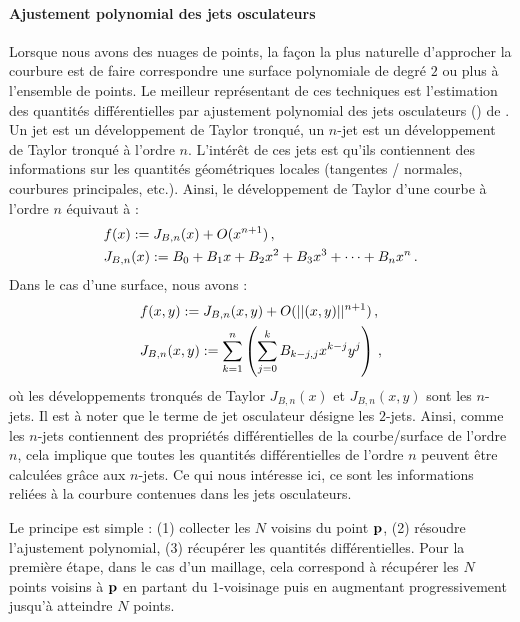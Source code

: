 \paragraph{Ajustement polynomial des jets osculateurs}
%
Lorsque nous avons des nuages de points, la façon la plus naturelle d'approcher
la courbure est de faire correspondre une surface polynomiale de degré $2$ ou
plus à l'ensemble de points. Le meilleur représentant de ces techniques est
l'estimation des quantités différentielles par ajustement polynomial des jets
osculateurs () de . Un jet
est un développement de Taylor tronqué, un $n$-jet est un développement de
Taylor tronqué à l'ordre $n$. L'intérêt de ces jets est qu'ils contiennent des
informations sur les quantités géométriques locales (tangentes / normales,
courbures principales, etc.).
%
%
Ainsi, le développement de Taylor d'une courbe à l'ordre $n$ équivaut à :
%
\begin{align}
  &f(x) := J_{B,n}(x) + O(x^{n+1}) \,, \\
  &J_{B,n}(x) := B_0 + B_1x + B_2x^2 + B_3x^3 + \cdots + B_nx^n \,.
\end{align}
%
Dans le cas d'une surface, nous avons :
%
\begin{align}
  &f(x,y) := J_{B,n}(x,y) + O(||(x,y)||^{n+1}) \,, \\
  &J_{B,n}(x,y) := \sum_{k=1}^{n} \left( \sum_{j=0}^{k} B_{k-j,j}x^{k-j}y^j \right) \,,
\end{align}
%
où les développements tronqués de Taylor $J_{B,n}(x)$ et $J_{B,n}(x,y)$ sont les
$n$-jets. Il est à noter que le terme de jet osculateur désigne les $2$-jets.
Ainsi, comme les $n$-jets contiennent des propriétés différentielles de la
courbe/surface de l'ordre $n$, cela implique que toutes les quantités
différentielles de l'ordre $n$ peuvent être calculées grâce aux $n$-jets. Ce qui
nous intéresse ici, ce sont les informations reliées à la courbure contenues
dans les jets osculateurs.


Le principe est simple : (1) collecter les $N$ voisins du point $\mathbf{p}$, (2)
résoudre l'ajustement polynomial, (3) récupérer les quantités différentielles.
%
%
Pour la première étape, dans le cas d'un maillage, cela correspond à récupérer
les $N$ points voisins à $\mathbf{p}$ en partant du $1$-voisinage puis en augmentant
progressivement jusqu'à atteindre $N$ points.
%


